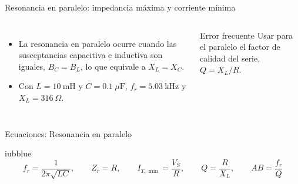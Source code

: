 \documentclass[aspectratio=169,11pt,xcolor={table}]{beamer}
\begin{document}
\begin{frame}{{\normalsize Resonancia en paralelo: impedancia máxima y corriente mínima}}
\begin{columns}[c,onlytextwidth]
\small
\begin{itemize}\setlength{\itemsep}{4pt}
  \item La resonancia en paralelo ocurre cuando las susceptancias capacitiva e inductiva son iguales, $B_C = B_L$, lo que equivale a $X_L = X_C$.
  \item Con $L = 10\ \text{mH}$ y $C = 0.1\ \mu\text{F}$, $f_r = 5.03\ \text{kHz}$ y $X_L = 316\ \Omega$.
\end{itemize}
\begin{cardO}{Error frecuente}
\footnotesize Usar para el paralelo el factor de calidad del serie, $Q = X_L/R$.
\end{cardO}
\end{columns}
\end{frame}

\begin{frame}{Ecuaciones: Resonancia en paralelo}
\begin{cajaplana}{iubblue}
\centering
{\large
\begin{equation*}
  f_r = \frac{1}{2\pi\sqrt{LC}}, \qquad Z_r = R, \qquad I_{T,\min} = \frac{V_S}{R}, \qquad Q = \frac{R}{X_L}, \qquad AB = \frac{f_r}{Q}
\end{equation*}
}
\end{cajaplana}
\end{frame}
\end{document}
